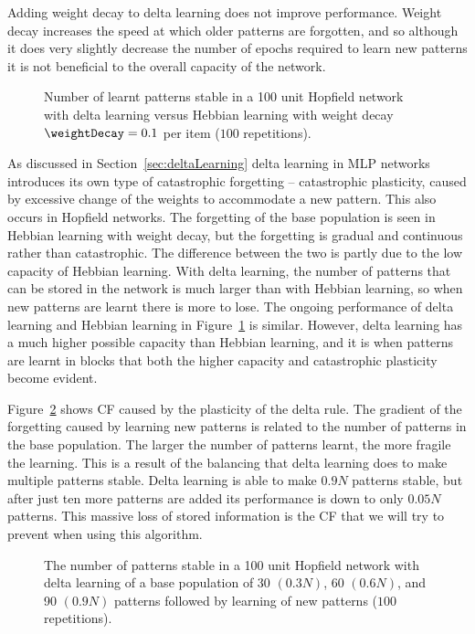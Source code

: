 Adding weight decay to delta learning does not improve performance.  Weight decay increases the speed at which older patterns are forgotten, and so although it does very slightly decrease the number of epochs required to learn new patterns it is not beneficial to the overall capacity of the network. 

\begin{figure}[tbp]
\small
\center
	
	\caption{Number of learnt patterns stable in a 100 unit Hopfield network  with delta learning versus Hebbian learning with weight decay $\weightDecay = 0.1$ per item ($100$ repetitions).}
	\label{fig:Delta-WeightDecayComp}
\end{figure}

As discussed in Section~\ref{sec:deltaLearning} delta learning in MLP networks introduces its own type of catastrophic forgetting -- catastrophic plasticity, caused by excessive change of the weights to accommodate a new pattern.  This also occurs in Hopfield networks. The forgetting of the base population is seen in Hebbian learning with weight decay, but the forgetting is gradual and continuous rather than catastrophic.  The difference between the two is partly due to the low capacity of Hebbian learning.  With delta learning, the number of patterns that can be stored in the network is much larger than with Hebbian learning, so when new patterns are learnt there is more to lose.  The ongoing performance of delta learning and Hebbian learning in Figure~\ref{fig:Delta-WeightDecayComp} is similar.  However, delta learning has a much higher possible capacity than Hebbian learning, and it is when patterns are learnt in blocks that both the higher capacity and catastrophic plasticity become evident.

Figure~\ref{fig:CFDelta} shows CF caused by the plasticity of the delta rule.  The gradient of the forgetting caused by learning new patterns is related to the number of patterns in the base population.  The larger the number of patterns learnt, the more fragile the learning.  This is a result of the balancing that delta learning does to make multiple patterns stable.  Delta learning is able to make $0.9N$ patterns stable, but after just ten more patterns are added its performance is down to only $0.05N$ patterns. This massive loss of stored information is the CF that we will try to prevent when using this algorithm.

\begin{figure}[tbp]
	\small
	\center
		 
	\caption{The number of patterns stable in a 100 unit Hopfield network  with delta learning of a base population of 30 $(0.3N)$, 60 $(0.6N)$, and 90 $(0.9N)$ patterns followed by learning of new patterns ($100$ repetitions).}
	\label{fig:CFDelta}
\end{figure}

